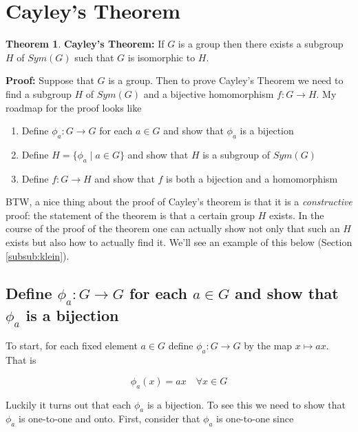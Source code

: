 \documentclass{article}
\theoremstyle{definition}
\newtheorem{theorem}{Theorem}[section]
\begin{document}
\section{Cayley's Theorem}

\begin{theorem}
\textbf{Cayley's Theorem: }If $G$ is a group then there exists a subgroup $H$ of $Sym(G)$ such that $G$ is isomorphic to $H$.
\label{thm:caley}
\end{theorem}

\noindent
\textbf{Proof:} Suppose that $G$ is a group.  Then to prove Cayley's Theorem we need to find a subgroup $H$ of $Sym(G)$ and a bijective homomorphism 
$f: G \rightarrow H$. My roadmap for the proof looks like

\bigskip
\begin{enumerate}
\item Define $\phi_{a}: G \rightarrow G$ for each $a \in G$ and show that $\phi_{a}$ is a bijection 
\item Define $H = \{\phi_{a} \mid a \in G\}$ and show that $H$ is a subgroup of $Sym(G)$
\item Define $f:G \rightarrow H$ and show that $f$ is both a bijection and a homomorphism
\end{enumerate}

\bigskip
\noindent
BTW, a nice thing about the proof of Cayley's theorem is that it is a \emph{constructive} proof: the statement of the theorem is that a certain group $H$ exists. 
In the course of the proof of the theorem one can actually show not only that such an $H$ exists but also how to actually find it. We'll see an example of this
below (Section \ref{subsub:klein}).


\subsection{Define $\phi_{a}: G \rightarrow G$ for each $a \in G$ and show that $\phi_{a}$ is a bijection}
To start, for each fixed element $a \in G$ define $\phi_{a}: G \rightarrow G$ by the map $x \mapsto ax$. That is 

\begin{equation}
\phi_{a}(x) = ax \quad \forall x \in G
\label{eqn:phi}
\end{equation}


\bigskip
\noindent
Luckily it turns out that each $\phi_{a}$ is a bijection.  To see this we need to show that $\phi_a$ is one-to-one and onto. 
First,  consider that $\phi_a$  is one-to-one since
\end{document}
